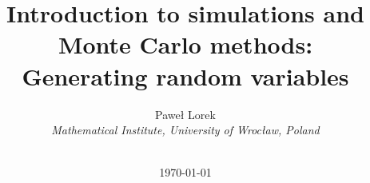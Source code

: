 \documentclass[aspectratio=169]{beamer}
\begin{document}
 

\title{Introduction to simulations and Monte Carlo methods:
\\ Generating random variables}
\author{Pawe{\l} Lorek  \\ \textsl{Mathematical Institute, University of Wroc{\l}aw, Poland} \\
\ \\
}


\date{\today}

\frame{\titlepage} 


% 


\end{document}
